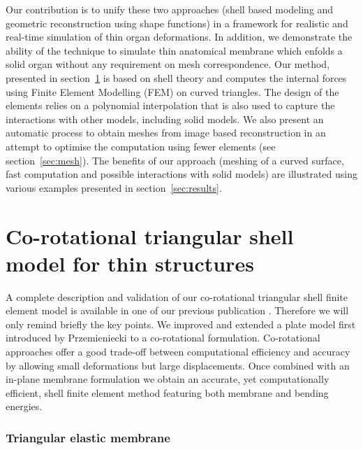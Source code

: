 \documentclass{llncs}
\begin{document}
Our contribution is to unify these two approaches (shell based modeling and geometric reconstruction using shape functions) in a framework  for realistic and real-time simulation of thin organ deformations. 
In addition, we demonstrate the ability of the technique to simulate thin anatomical membrane which enfolds a solid organ without any requirement on mesh correspondence.
Our method, presented in section~\ref{sec:model} is based on shell theory and computes the internal forces using Finite Element Modelling (FEM) on curved triangles. The design of the elements relies on a polynomial interpolation that is also used to capture the interactions with other models, including solid models. We also present an automatic process to obtain meshes from image based reconstruction in an attempt to optimise the computation using fewer elements (see section~\ref{sec:mesh}). The benefits of our approach (meshing of a curved surface, fast computation and possible interactions with solid models) are illustrated using various examples presented in section~\ref{sec:results}.

\section{Co-rotational triangular shell model for thin structures}
\label{sec:model}


A complete description and validation of our co-rotational triangular shell finite element model is available in one of our previous publication \cite{Comas2010ISBMS}. Therefore we will only remind briefly the key points. We improved and extended a plate model first introduced by Przemieniecki \cite{Przemieniecki68} to a co-rotational formulation. Co-rotational approaches offer a good trade-off between computational efficiency and accuracy by allowing small deformations but large displacements. Once combined with an in-plane membrane formulation we obtain an accurate, yet computationally efficient, shell finite element method featuring both membrane and bending energies. 


\subsubsection{Triangular elastic membrane}
\end{document}
